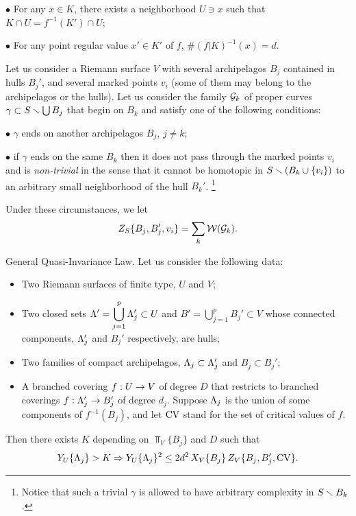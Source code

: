 \ssk \nin $\bullet$ 
   For any $x\in K$, there exists a  neighborhood $U\ni x$ such that $K\cap U = f^{-1}(K')\cap U$;

\ssk \nin $\bullet$ 
  For  any point regular value $x'\in K'$ of $f$, $\# (f|K)^{-1}(x)=d$.  
 
\ssk
Let us consider a Riemann surface $V$ with several archipelagos $B_j$ contained in hulls $B_j'$,
and several marked points $v_i$ (some of them may belong to the archipelagos or the hulls).  
Let us consider the family ${\cal G}_k$ of proper curves 
$\gamma\subset S\smallsetminus \bigcup B_j $ that begin on $B_k$ and satisfy one of the following conditions:

\ssk \nin $\bullet$
   $\gamma$ ends on another archipelagos  $B_j$, $j\not=k$;

\ssk \nin $\bullet$
 if $\gamma$ ends on the same $B_k$ then it does not pass through the marked points $v_i$ 
  and is  {\it non-trivial} in the sense that it cannot be homotopic in  $S\smallsetminus (B_k\cup \{v_i\})$
  to an arbitrary small neighborhood  of the hull $B_k'$.%
\footnote{Notice that such a trivial $\gamma$ is allowed to have arbitrary complexity in $S\smallsetminus B_k$.}  

\ssk \nin
Under these circumstances, we let  
$$
     Z_S\{ B_j , B_j',  v_i\}  = \sum_k {\cal W}({\cal G}_k). 
$$


\proclaim General Quasi-Invariance Law.
Let us consider the following data:
\begin{itemize}
\item         Two Riemann surfaces of finite type, $U$ and $V$;
\item 
     Two closed sets $\displaystyle{{\Lambda}'=\bigcup_{j=1}^p {\Lambda}_j'\subset U}$ and 
$\displaystyle{B'=\bigcup_{j=1}^p B_j' \subset V} $ whose connected components, 
${\Lambda}_j'$ and $B_j'$ respectively, are hulls;
\item
   Two families of compact archipelagos,  ${\Lambda}_j\subset {\Lambda}_j'$ and $B_j\subset B_j'$;
\item
     A branched covering $f: U \rightarrow V$ of degree $D$ that restricts to branched coverings
$f: {\Lambda}_j'\rightarrow B_j'$ of degree $d_j$. Suppose ${\Lambda}_j$ is the union of some components of $f^{-1}(B_j)$,
and let $\mathrm{CV}$ stand for the set of critical values of $f$.
\end{itemize}
Then there exists $K$ depending on $\Top_V\{B_j\}$ and $D$ such that
     $$ Y_U\{{\Lambda}_j\} >K \Rightarrow  Y_U \{{\Lambda}_j\}^2 \leq 2 d^2\, X_V \{B_j\} \, Z_V \{B_j , B_j' , \mathrm{CV}\}. $$ 


